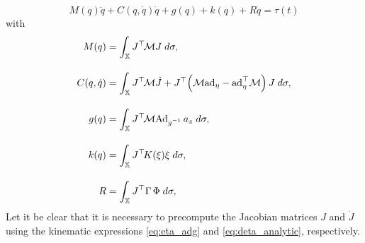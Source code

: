 \begin{equation}
M(q) \ddot{q} + C(q,\dot{q}) \dot{q} + g(q) + k(q) + R\dot{q} = \tau(t)	
\end{equation}
 with 
%
\begin{align}
M(q) & = \int_\Xs J^\top\! \mathcal{M} J \; d\sigma, \\[1.0em]
C(q,\dot{q}) & = \int_\Xs J^\top\! \mathcal{M}\dot{J} + J^\top\! \left( \mathcal{M} \ad_{\eta} - \ad_{\eta}^\top \mathcal{M} \right)J \; d\sigma, \label{eq:coriolis_lag}\\[1.0em]
g(q) & = \int_\Xs J^\top\! \mathcal{M} \Ad_{g\inv}\,a_z \; d\sigma, \\[1.0em]
k(q) & = \int_\Xs J^\top\! K(\xi) \xi\; d\sigma, \\[1.0em]
R & = \int_\Xs J^\top\! \,\Gamma \,\Phi\; d\sigma, 
\end{align}
%
Let it be clear that it is necessary to precompute the Jacobian matrices $J$ and $\dot{J}$ using the kinematic expressions \eqref{eq:eta_adg} and \eqref{eq:deta_analytic}, respectively. 

